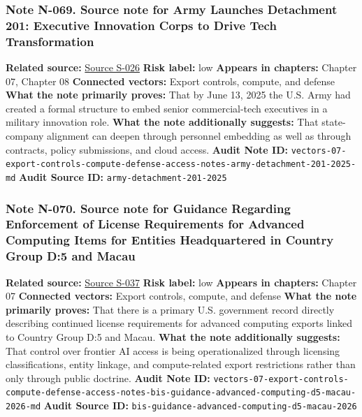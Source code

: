 \documentclass[
  american,
  11pt,
  letterpaper,
]{article}
\begin{document}
\subsubsection{Note N-069. Source note for Army Launches Detachment 201:
Executive Innovation Corps to Drive Tech
Transformation}\label{note-n-069-vectors-07-export-controls-compute-defense-access-notes-army-detachment-201-2025-md}

\textbf{Related source:}
\hyperref[source-s-026-army-launches-detachment-201-executive-innovation-corps-to-drive-tech-transformation]{Source
S-026} \textbf{Risk label:} low \textbf{Appears in chapters:} Chapter
07, Chapter 08 \textbf{Connected vectors:} Export controls, compute, and
defense \textbf{What the note primarily proves:} That by June 13, 2025
the U.S. Army had created a formal structure to embed senior
commercial-tech executives in a military innovation role. \textbf{What
the note additionally suggests:} That state-company alignment can deepen
through personnel embedding as well as through contracts, policy
submissions, and cloud access. \textbf{Audit Note ID:}
\texttt{vectors-07-export-controls-compute-defense-access-notes-army-detachment-201-2025-md}
\textbf{Audit Source ID:} \texttt{army-detachment-201-2025}

\subsubsection{Note N-070. Source note for Guidance Regarding
Enforcement of License Requirements for Advanced Computing Items for
Entities Headquartered in Country Group D:5 and
Macau}\label{note-n-070-vectors-07-export-controls-compute-defense-access-notes-bis-guidance-advanced-computing-d5-macau-2026-md}

\textbf{Related source:}
\hyperref[source-s-037-guidance-regarding-enforcement-of-license-requirements-for-advanced-computing-items-for-entities-headquartered-in-country-group-d-5-and-macau]{Source
S-037} \textbf{Risk label:} low \textbf{Appears in chapters:} Chapter 07
\textbf{Connected vectors:} Export controls, compute, and defense
\textbf{What the note primarily proves:} That there is a primary U.S.
government record directly describing continued license requirements for
advanced computing exports linked to Country Group D:5 and Macau.
\textbf{What the note additionally suggests:} That control over frontier
AI access is being operationalized through licensing classifications,
entity linkage, and compute-related export restrictions rather than only
through public doctrine. \textbf{Audit Note ID:}
\texttt{vectors-07-export-controls-compute-defense-access-notes-bis-guidance-advanced-computing-d5-macau-2026-md}
\textbf{Audit Source ID:}
\texttt{bis-guidance-advanced-computing-d5-macau-2026}
\end{document}
